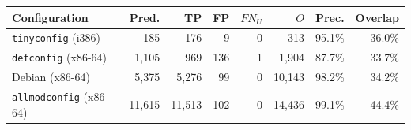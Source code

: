 \begin{tabular}{lrrrrrrr}
\toprule
Configuration & Pred. & TP & FP & $FN_U$ & $O$ & Prec. & Overlap \\
\midrule
\texttt{tinyconfig} (i386) & 185 & 176 & 9 & 0 & 313 & 95.1\% & 36.0\% \\
\texttt{defconfig} (x86-64) & 1,105 & 969 & 136 & 1 & 1,904 & 87.7\% & 33.7\% \\
Debian (x86-64) & 5,375 & 5,276 & 99 & 0 & 10,143 & 98.2\% & 34.2\% \\
\texttt{allmodconfig} (x86-64) & 11,615 & 11,513 & 102 & 0 & 14,436 & 99.1\% & 44.4\% \\
\bottomrule
\end{tabular}
